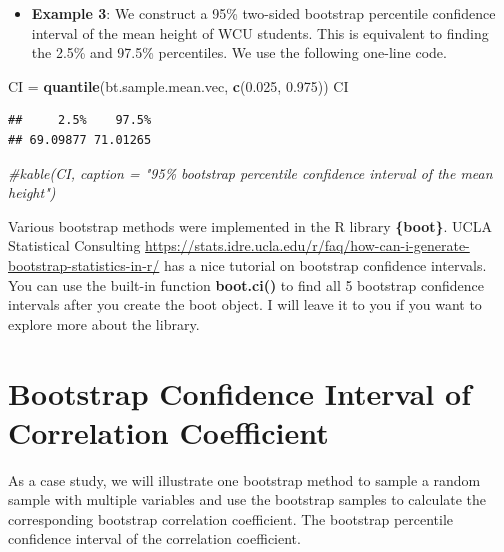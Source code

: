 \documentclass[
]{book}
\newenvironment{Shaded}{\begin{snugshade}}{\end{snugshade}}
\newcommand{\CommentTok}[1]{\textcolor[rgb]{0.56,0.35,0.01}{\textit{#1}}}
\newcommand{\FloatTok}[1]{\textcolor[rgb]{0.00,0.00,0.81}{#1}}
\newcommand{\FunctionTok}[1]{\textcolor[rgb]{0.13,0.29,0.53}{\textbf{#1}}}
\newcommand{\NormalTok}[1]{#1}
\newcommand{\OtherTok}[1]{\textcolor[rgb]{0.56,0.35,0.01}{#1}}
\providecommand{\tightlist}{%
  \setlength{\itemsep}{0pt}\setlength{\parskip}{0pt}}
\begin{document}
\begin{itemize}
\tightlist
\item
  \textbf{Example 3}: We construct a 95\% two-sided bootstrap percentile confidence interval of the mean height of WCU students. This is equivalent to finding the 2.5\% and 97.5\% percentiles. We use the following one-line code.
\end{itemize}

\begin{Shaded}
\begin{Highlighting}[]
\NormalTok{CI }\OtherTok{=} \FunctionTok{quantile}\NormalTok{(bt.sample.mean.vec, }\FunctionTok{c}\NormalTok{(}\FloatTok{0.025}\NormalTok{, }\FloatTok{0.975}\NormalTok{))}
\NormalTok{CI}
\end{Highlighting}
\end{Shaded}

\begin{verbatim}
##     2.5%    97.5% 
## 69.09877 71.01265
\end{verbatim}

\begin{Shaded}
\begin{Highlighting}[]
\CommentTok{\#kable(CI, caption = "95\% bootstrap percentile confidence interval of the mean height")}
\end{Highlighting}
\end{Shaded}

Various bootstrap methods were implemented in the R library \textbf{\{boot\}}. UCLA Statistical Consulting \url{https://stats.idre.ucla.edu/r/faq/how-can-i-generate-bootstrap-statistics-in-r/} has a nice tutorial on bootstrap confidence intervals. You can use the built-in function \textbf{boot.ci()} to find all 5 bootstrap confidence intervals after you create the boot object. I will leave it to you if you want to explore more about the library.

\hypertarget{bootstrap-confidence-interval-of-correlation-coefficient}{%
\section{Bootstrap Confidence Interval of Correlation Coefficient}\label{bootstrap-confidence-interval-of-correlation-coefficient}}

As a case study, we will illustrate one bootstrap method to sample a random sample with multiple variables and use the bootstrap samples to calculate the corresponding bootstrap correlation coefficient. The bootstrap percentile confidence interval of the correlation coefficient.
\end{document}
